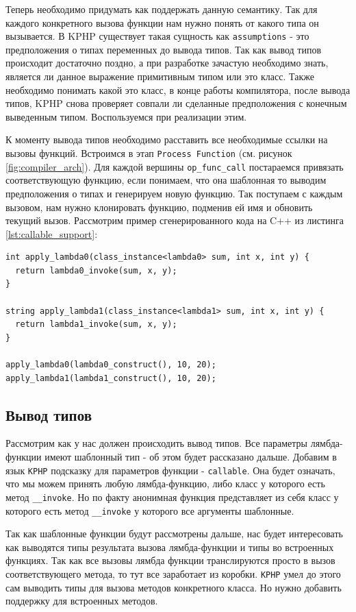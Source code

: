 Теперь необходимо придумать как поддержать данную семантику.
Так для каждого конкретного вызова функции нам нужно понять от какого типа он вызывается.
В KPHP существует такая сущность как \verb|assumptions| - это предположения о типах переменных до вывода типов.
Так как вывод типов происходит достаточно поздно, а при разработке зачастую необходимо знать, является ли данное выражение примитивным типом или это класс.
Также необходимо понимать какой это класс, в конце работы компилятора, после вывода типов, KPHP снова проверяет совпали ли сделанные предположения с конечным выведенным типом.
Воспользуемся при реализации этим.

К моменту вывода типов необходимо расставить все необходимые ссылки на вызовы функций.
Встроимся в этап \verb|Process Function| (см. рисунок \ref{fig:compiler_arch}).
Для каждой вершины \verb|op_func_call| постараемся привязать соответствующую функцию, если понимаем, что она шаблонная то выводим предположения о типах и генерируем новую функцию.
Так поступаем с каждым вызовом, нам нужно клонировать функцию, подменив ей имя и обновить текущий вызов.
Рассмотрим пример сгенерированного кода на C++ из листинга \ref{lst:callable_support}:
\begin{lstlisting}
int apply_lambda0(class_instance<lambda0> sum, int x, int y) {
  return lambda0_invoke(sum, x, y);
}

string apply_lambda1(class_instance<lambda1> sum, int x, int y) {
  return lambda1_invoke(sum, x, y);
}

apply_lambda0(lambda0_construct(), 10, 20);
apply_lambda1(lambda1_construct(), 10, 20);
\end{lstlisting}

\subsection{Вывод типов}
Рассмотрим как у нас должен происходить вывод типов.
Все параметры лямбда-функции имеют шаблонный тип - об этом будет рассказано дальше.
Добавим в язык \verb|KPHP| подсказку для параметров функции - \verb|callable|.
Она будет означать, что мы можем принять любую лямбда-функцию, либо класс у которого есть метод \verb|__invoke|.
Но по факту анонимная функция представляет из себя класс у которого есть метод \verb|__invoke| у которого все аргументы шаблонные.

Так как шаблонные функции будут рассмотрены дальше, нас будет интересовать как выводятся типы результата вызова лямбда-функции и типы во встроенных функциях.
Так как все вызовы лямбда функции транслируются просто в вызов соответствующего метода, то тут все заработает из коробки.
\verb|KPHP| умел до этого сам выводить типы для вызова методов конкретного класса.
Но нужно добавить поддержку для встроенных методов.


